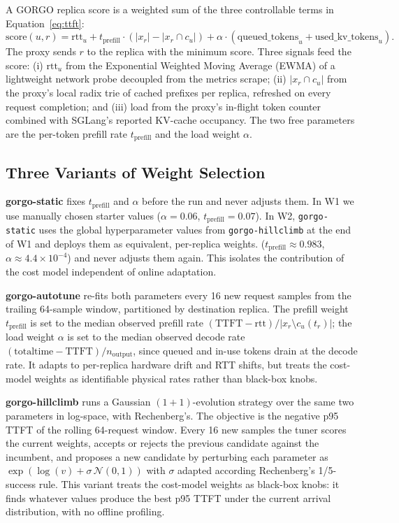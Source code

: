 \documentclass{article}
\begin{document}
A GORGO replica score is a weighted sum of the three controllable terms in
Equation~\ref{eq:ttft}:
\begin{equation}
\mathrm{score}(u, r) = \mathrm{rtt}_u
  + t_{\mathrm{prefill}} \cdot (|x_r| - |x_r \cap c_u|)
  + \alpha \cdot (\mathrm{queued\_tokens}_u + \mathrm{used\_kv\_tokens}_u).
\label{eq:score}
\end{equation}
The proxy sends $r$ to the replica with the minimum score. Three signals feed
the score: (i) $\mathrm{rtt}_u$ from the Exponential Weighted Moving Average (EWMA) of a lightweight network probe
decoupled from the metrics scrape; (ii) $|x_r \cap c_u|$ from the proxy's local
radix trie of cached prefixes per replica, refreshed on every request completion;
and (iii) load from the proxy's in-flight token counter combined with SGLang's
reported KV-cache occupancy. The two free parameters are the per-token prefill
rate $t_{\mathrm{prefill}}$ and the load weight $\alpha$.

\subsection{Three Variants of Weight Selection}

\textbf{gorgo-static} fixes $t_{\mathrm{prefill}}$ and $\alpha$ before the run
and never adjusts them. In W1 we use manually chosen starter values
($\alpha=0.06$, $t_{\mathrm{prefill}}=0.07$). In W2, \texttt{gorgo-static}
uses the global hyperparameter values from \texttt{gorgo-hillclimb} at the end of W1 and deploys them as equivalent, per-replica weights.
($t_{\mathrm{prefill}}\approx 0.983$, $\alpha\approx 4.4\times10^{-4}$) and
never adjusts them again. This isolates the contribution of the cost model
independent of online adaptation.

\textbf{gorgo-autotune} re-fits both parameters every 16 new request samples from the trailing 64-sample window, partitioned by destination replica. The prefill weight $t_{\mathrm{prefill}}$ is set to the median observed prefill rate $(\mathrm{TTFT} - \mathrm{rtt}) / |x_r \setminus c_u(t_r)|$; the load weight $\alpha$ is set to the median observed decode rate $(\mathrm{total time} - \mathrm{TTFT}) / n_{\mathrm{output}}$, since queued and in-use tokens drain at the decode rate. It adapts to per-replica hardware drift and RTT shifts, but treats the cost-model weights as identifiable physical rates rather than black-box knobs.

\textbf{gorgo-hillclimb} runs a Gaussian $(1{+}1)$-evolution strategy
\citep{rechenberg1973} over the same two parameters in log-space, with
Rechenberg's. The objective is the
negative p95 TTFT of the rolling 64-request window. Every 16 new samples the
tuner scores the current weights, accepts or rejects the previous candidate
against the incumbent, and proposes a new candidate by perturbing each parameter
as $\exp(\log(v) + \sigma\,\mathcal{N}(0,1))$ with $\sigma$ adapted according
Rechenberg's 1/5-success rule. This variant treats the cost-model weights as
black-box knobs: it finds whatever values produce the best p95 TTFT under the
current arrival distribution, with no offline profiling.
\end{document}
